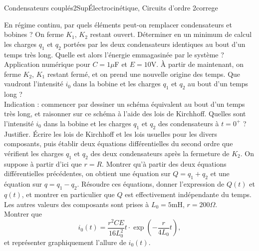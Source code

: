 \begin{exercise}{Condensateurs couplés}{2}{Sup}{\'Electrocinétique, Circuits d'ordre 2}{correge}
\begin{questions}
    \question En régime continu, par quels éléments peut-on remplacer condensateurs et bobines ?
    \question On ferme $K_1$, $K_2$ restant ouvert. Déterminer en un minimum de calcul  les charges $q_1$ et $q_2$ portées par les deux condensateurs identiques au bout d'un temps très long.
    \question Quelle est alors l'énergie emmagasinée par le système ? \\
              Application numérique pour $C=1\mu$F et $E=10$V.
    \question À partir de maintenant, on ferme $K_2$, $K_1$ restant fermé, et on prend une nouvelle origine des temps.
              Que vaudront l'intensité $i_0$ dans la bobine et les charges $q_1$ et $q_2$ au bout d'un temps long ? \\
              Indication : commencer par dessiner un schéma équivalent au bout d'un temps très long, et raisonner sur ce schéma à l'aide des lois de Kirchhoff.
    \question Quelles sont l'intensité $i_0$ dans la bobine et les charges $q_1$ et $q_2$ des condensateurs à $t=0^+$ ? Justifier.
    \question Écrire les lois de Kirchhoff et les lois usuelles pour les divers composants, puis établir deux équations différentielles du second ordre que vérifient les charges $q_1$ et $q_2$ des deux condensateurs après la fermeture de $K_2$.
    \question On suppose à partir d'ici que $r=R$. Montrer qu'à partir des deux équations différentielles précédentes, on obtient une équation sur $Q=q_1+q_2$ et une équation sur $q=q_1-q_2$.
    \question Résoudre ces équations, donner l'expression de $Q(t)$ et $q(t)$, et montrer en particulier que $Q$ est effectivement indépendante du temps.
    \question Les autres valeurs des composants sont prises à $L_0=5$mH, $r=200\Omega$. \\
              Montrer que 
              \[i_0(t) = \frac{r^2 C E}{16 L_0^2} t\cdot\exp\left(-\frac{r}{4L_0}t\right),\]
              et représenter graphiquement l'allure de $i_0(t)$.
\end{questions}



\end{exercise}

